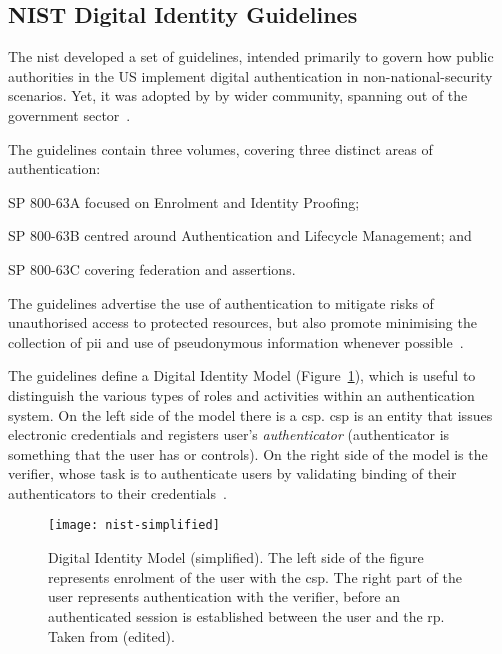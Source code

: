 \subsection{NIST Digital Identity Guidelines}

The \acrfull{nist} developed a set of guidelines, intended primarily to govern how public authorities in the US implement digital authentication in non-national-security scenarios. Yet, it was adopted by by wider community, spanning out of the government sector~\cite{Grassi2017GovernmentCollaboration}.

The guidelines contain three volumes, covering three distinct areas of authentication:
\begin{enumerate*}[label=(\roman*)]
    \item SP 800-63A focused on Enrolment and Identity Proofing;
    \item SP 800-63B centred around Authentication and Lifecycle Management; and
    \item SP 800-63C covering federation and assertions.
\end{enumerate*}
The guidelines advertise the use of authentication to mitigate risks of unauthorised access to protected resources, but also promote minimising the collection of \acrfull{pii} and use of pseudonymous information whenever possible~\cite{Grassi2017Digital3}.

The guidelines define a Digital Identity Model (Figure~\ref{fig:nist-model}), which is useful to distinguish the various types of roles and activities within an authentication system. On the left side of the model there is a \acrfull{csp}. \acrshort{csp} is an entity that issues electronic credentials and registers user's \textit{authenticator} (authenticator is something that the user has or controls). On the right side of the model is the verifier, whose task is to authenticate users by validating binding of their authenticators to their credentials~\cite{Grassi2017Digital3}.

 \begin{figure}[ht]
    \centering
    \texttt{[image: nist-simplified]}
    \caption{Digital Identity Model (simplified). The left side of the figure represents enrolment of the user with the \acrshort{csp}. The right part of the user represents authentication with the verifier, before an authenticated session is established between the user and the \acrshort{rp}. Taken from (edited).
    }
    \label{fig:nist-model}
\end{figure}

